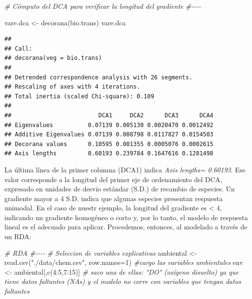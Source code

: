 \documentclass[
]{book}
\newenvironment{Shaded}{\begin{snugshade}}{\end{snugshade}}
\newcommand{\AttributeTok}[1]{\textcolor[rgb]{0.77,0.63,0.00}{#1}}
\newcommand{\CommentTok}[1]{\textcolor[rgb]{0.56,0.35,0.01}{\textit{#1}}}
\newcommand{\DecValTok}[1]{\textcolor[rgb]{0.00,0.00,0.81}{#1}}
\newcommand{\FunctionTok}[1]{\textcolor[rgb]{0.00,0.00,0.00}{#1}}
\newcommand{\NormalTok}[1]{#1}
\newcommand{\OtherTok}[1]{\textcolor[rgb]{0.56,0.35,0.01}{#1}}
\newcommand{\SpecialCharTok}[1]{\textcolor[rgb]{0.00,0.00,0.00}{#1}}
\newcommand{\StringTok}[1]{\textcolor[rgb]{0.31,0.60,0.02}{#1}}
\begin{document}
\begin{Shaded}
\begin{Highlighting}[]
\CommentTok{\# Cómputo del DCA para verificar la longitud del gradiente}
\CommentTok{\#{-}{-}{-}{-}}

\NormalTok{vare.dca }\OtherTok{\textless{}{-}} \FunctionTok{decorana}\NormalTok{(bio.trans)}
\NormalTok{vare.dca}
\end{Highlighting}
\end{Shaded}

\begin{verbatim}
## 
## Call:
## decorana(veg = bio.trans) 
## 
## Detrended correspondence analysis with 26 segments.
## Rescaling of axes with 4 iterations.
## Total inertia (scaled Chi-square): 0.109 
## 
##                         DCA1     DCA2      DCA3      DCA4
## Eigenvalues          0.07139 0.005130 0.0020470 0.0012492
## Additive Eigenvalues 0.07139 0.008798 0.0117827 0.0154503
## Decorana values      0.10595 0.001355 0.0005076 0.0002615
## Axis lengths         0.60193 0.239784 0.1647616 0.1281498
\end{verbatim}

La última línea de la primer columna (DCA1) indica \emph{Axis lengths= 0.60193}. Ese valor corresponde a la longitud del primer eje de ordenamiento del DCA, expresado en unidades de desvio estándar (S.D.) de recambio de especies. Un gradiente mayor a 4 S.D. indica que algunas especies presentan respuesta unimodal. En el caso de nuestr ejemplo, la longitud del gradiente es \textless{} 4, indicando un gradiente homogéneo o corto y, por lo tanto, el modelo de respuesta lineal es el adecuado para aplicar.
Procedemos, entonces, al modelado a través de un RDA:

\begin{Shaded}
\begin{Highlighting}[]
\CommentTok{\# RDA}
\CommentTok{\#{-}{-}{-}{-}}
\CommentTok{\# Seleccion de variables explicativas}
\NormalTok{ambiental }\OtherTok{\textless{}{-}}\FunctionTok{read.csv}\NormalTok{(}\StringTok{"./data/chem.csv"}\NormalTok{, }\AttributeTok{row.names=}\DecValTok{1}\NormalTok{) }\CommentTok{\#cargo las variables ambientales}
\NormalTok{env }\OtherTok{\textless{}{-}}\NormalTok{ ambiental[,}\FunctionTok{c}\NormalTok{(}\DecValTok{4}\SpecialCharTok{:}\DecValTok{5}\NormalTok{,}\DecValTok{7}\SpecialCharTok{:}\DecValTok{15}\NormalTok{)] }\CommentTok{\# saco una de ellas: "DO" (oxígeno disuelto) ya que tiene datos faltantes (NAs) y el modelo no corre con variables que tengan datos faltantes}
\end{Highlighting}
\end{Shaded}
\end{document}
